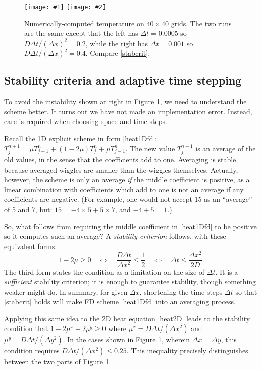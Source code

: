 \documentclass[letterpaper,final,12pt,reqno]{amsart}
\newcommand{\twofigsizes}[5]{
\begin{figure}[ht]
\centering
\texttt{[image: \#1]} \quad
\texttt{[image: \#2]}
\caption{#3}
\label{fig:#1}
\end{figure}}
\newcommand{\twofig}[3]{\twofigsizes{#1}{#2}{#3}{2.5in}{2.5in}}
\begin{document}
\twofig{stability}{instability}{Numerically-computed temperature on $40\times 40$ grids.  The two runs are the same except that the left has $\Delta t=0.0005$ so $D\Delta t/(\Delta x)^2= 0.2$, while the right has $\Delta t=0.001$ so $D\Delta t/(\Delta x)^2= 0.4$.  Compare \eqref{stabcrit}.}

\subsection*{Stability criteria and adaptive time stepping}  To avoid the instability shown at right in Figure \ref{fig:stability}, we need to understand the scheme better.  It turns out we have not made an implementation error.  Instead, care is required when choosing space and time steps.

Recall the 1D explicit scheme in form \eqref{heat1Dfd}: $T_j^{n+1} = \mu T_{j+1}^n + (1 - 2 \mu) T_j^n + \mu T_{j-1}^n$.  The new value $T_j^{n+1}$ is an average of the old values, in the sense that the coefficients add to one.  Averaging is stable because averaged wiggles are smaller than the wiggles themselves.  Actually, however, the scheme is only an average \emph{if} the middle coefficient is positive, as a linear combination with coefficients which add to one is not an average if any coefficients are negative.  (For example, one would not accept 15 as an ``average'' of 5 and 7, but: $15 = -4 \times 5 + 5 \times 7$, and $-4+5=1$.)

So, what follows from requiring the middle coefficient in \eqref{heat1Dfd} to be positive so it computes such an average?  A \emph{stability criterion} follows, with these equivalent forms:
\begin{equation}
   1 - 2 \mu \ge 0 \quad \iff \quad \frac{D\Delta t}{\Delta x^2} \le \frac{1}{2} \quad \iff \quad \Delta t \le \frac{\Delta x^2}{2 D}.  \label{stabcrit}
\end{equation}
The third form states the condition as a limitation on the size of $\Delta t$.  It is a \emph{sufficient} stability criterion; it is enough to guarantee stability, though something weaker might do.  In summary, for given $\Delta x$, shortening the time steps $\Delta t$ so that \eqref{stabcrit} holds will make FD scheme \eqref{heat1Dfd} into an averaging process.

Applying this same idea to the 2D heat equation \eqref{heat2D} leads to the stability condition that $1-2\mu^x-2\mu^y \ge 0$ where $\mu^x = D \Delta t / (\Delta x^2)$ and $\mu^y = D \Delta t / (\Delta y^2)$.  In the cases shown in Figure \ref{fig:stability}, wherein $\Delta x=\Delta y$, this condition requires $D \Delta t /(\Delta x^2) \le 0.25$.  This inequality precisely distinguishes between the two parts of Figure \ref{fig:stability}.
\end{document}
